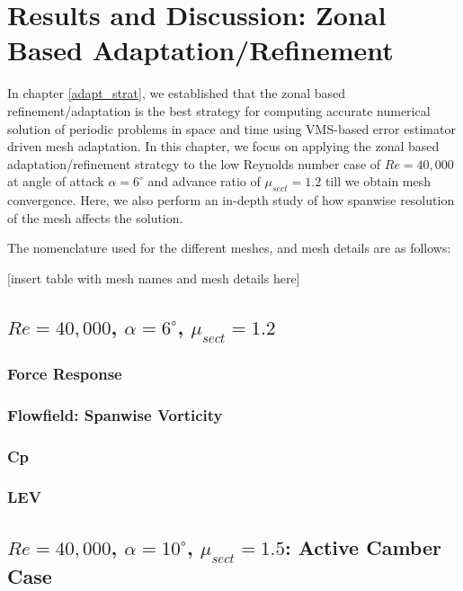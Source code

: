 \chapter{Results and Discussion: Zonal Based Adaptation/Refinement}

In chapter \ref{adapt_strat}, we established that the zonal based refinement/adaptation is the best strategy for computing accurate numerical solution of periodic problems in space and time using VMS-based error estimator driven mesh adaptation. In this chapter, we focus on applying the zonal based adaptation/refinement strategy to the low Reynolds number case of $Re=40,000$ at angle of attack $\alpha=6^\circ$ and advance ratio of $\mu_{sect}=1.2$ till we obtain mesh convergence. Here, we also perform an in-depth study of how spanwise resolution of the mesh affects the solution.

The nomenclature used for the different meshes, and mesh details are as follows:

[insert table with mesh names and mesh details here]

\section{ $Re=40,000$,  $\alpha=6^\circ$, $\mu_{sect}=1.2$}

\subsection{Force Response}

\label{sec:zonal_force_response}

\subsection{Flowfield: Spanwise Vorticity}

\label{sec:zonal_vorticity}

\subsection{Cp}

\label{sec:zonal_cp}

\subsection{LEV}

\label{sec:zonal_LEV}


\section{ $Re=40,000$,  $\alpha=10^\circ$, $\mu_{sect}=1.5$: Active Camber Case}


\label{sec:zonal_active_camber}

